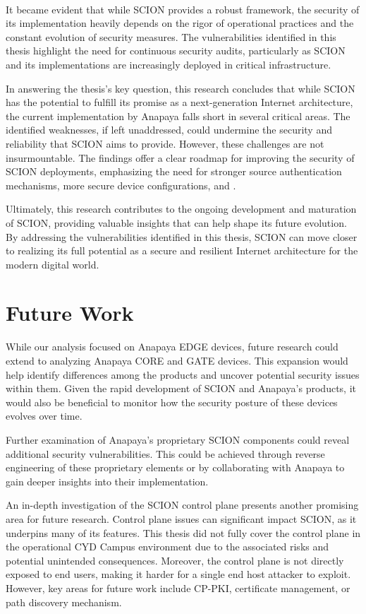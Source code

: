 \\
It became evident that while SCION provides a robust framework, the security of its implementation heavily depends on the rigor of operational practices and the constant evolution of security measures.
The vulnerabilities identified in this thesis highlight the need for continuous security audits, particularly as SCION and its implementations are increasingly deployed in critical infrastructure.

In answering the thesis's key question, this research concludes that while SCION has the potential to fulfill its promise as a next-generation Internet architecture, the current implementation by Anapaya falls short in several critical areas.
The identified weaknesses, if left unaddressed, could undermine the security and reliability that SCION aims to provide.
However, these challenges are not insurmountable.
The findings offer a clear roadmap for improving the security of SCION deployments, emphasizing the need for stronger source authentication mechanisms, more secure device configurations, and .

Ultimately, this research contributes to the ongoing development and maturation of SCION, providing valuable insights that can help shape its future evolution.
By addressing the vulnerabilities identified in this thesis, SCION can move closer to realizing its full potential as a secure and resilient Internet architecture for the modern digital world.


\section{Future Work}

While our analysis focused on Anapaya EDGE devices, future research could extend to analyzing Anapaya CORE and GATE devices.
This expansion would help identify differences among the products and uncover potential security issues within them.
Given the rapid development of SCION and Anapaya's products, it would also be beneficial to monitor how the security posture of these devices evolves over time.

Further examination of Anapaya's proprietary SCION components could reveal additional security vulnerabilities.
This could be achieved through reverse engineering of these proprietary elements or by collaborating with Anapaya to gain deeper insights into their implementation.

An in-depth investigation of the SCION control plane presents another promising area for future research.
Control plane issues can significant impact SCION, as it underpins many of its features.
This thesis did not fully cover the control plane in the operational CYD Campus environment due to the associated risks and potential unintended consequences.
Moreover, the control plane is not directly exposed to end users, making it harder for a single end host attacker to exploit.
However, key areas for future work include CP-PKI, certificate management, or path discovery mechanism.

